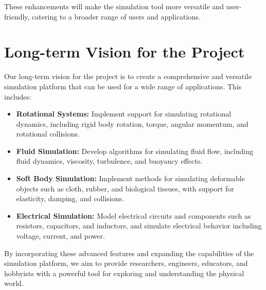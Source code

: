 These enhancements will make the simulation tool more versatile and user-friendly, catering to a broader range of users and applications.

\section{Long-term Vision for the Project}

Our long-term vision for the project is to create a comprehensive and versatile simulation platform that can be used for a wide range of applications. This includes:

\begin{itemize}
    \item \textbf{Rotational Systems:} Implement support for simulating rotational dynamics, including rigid body rotation, torque, angular momentum, and rotational collisions.
    
    \begin{center}
    \end{center}
    
    \item \textbf{Fluid Simulation:} Develop algorithms for simulating fluid flow, including fluid dynamics, viscosity, turbulence, and buoyancy effects.
    
    \item \textbf{Soft Body Simulation:} Implement methods for simulating deformable objects such as cloth, rubber, and biological tissues, with support for elasticity, damping, and collisions.
    
    \item \textbf{Electrical Simulation:} Model electrical circuits and components such as resistors, capacitors, and inductors, and simulate electrical behavior including voltage, current, and power.
\end{itemize}

By incorporating these advanced features and expanding the capabilities of the simulation platform, we aim to provide researchers, engineers, educators, and hobbyists with a powerful tool for exploring and understanding the physical world.
